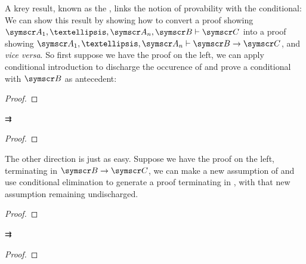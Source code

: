 A krey result, known as the , links the notion of provability with the conditional:  We can show this result by showing how to convert a proof showing $\meta{A}_{1},…,\meta{A}_{n},\meta{B} \proves \meta{C}$ into a proof showing $\meta{A}_{1},…,\meta{A}_{n} \proves \meta{B} \to \meta{C}$, and \emph{vice versa}. So first suppose we have the proof on the left, we can apply conditional introduction to discharge the occurence of  and prove a conditional with $\meta{B}$ as antecedent:
    		 \begin{multicols}{2}\noindent\begin{proof}
    				\hypo[\ ]{}{\vdots}
    				\open
    				\open{}
    				\have[\ ]{}{\vdots}
    			\end{proof} \quad  ⇉\quad
    			\begin{proof}
    				\hypo[\ ]{}{\vdots}
    				\open
    				\open{}
    				\have[\ ]{}{\vdots}
    				\close
    			\end{proof}\end{multicols}
The other direction is just as easy. Suppose we have the proof on the left, terminating in $\meta{B}\eif\meta{C}$, we can make a new assumption of  and use conditional elimination to generate a proof terminating in , with that new assumption remaining undischarged. 
 \begin{multicols}{2}\noindent\begin{proof}
    				\hypo[\ ]{}{\vdots}
    				\open
    				\have[\ ]{}{\vdots}
    			\end{proof} \quad  ⇉\quad
    			\begin{proof}
    				\hypo[\ ]{}{\vdots}
    				\open
    				\have[\ ]{}{\vdots}
    				\open
    			\end{proof}\end{multicols}

